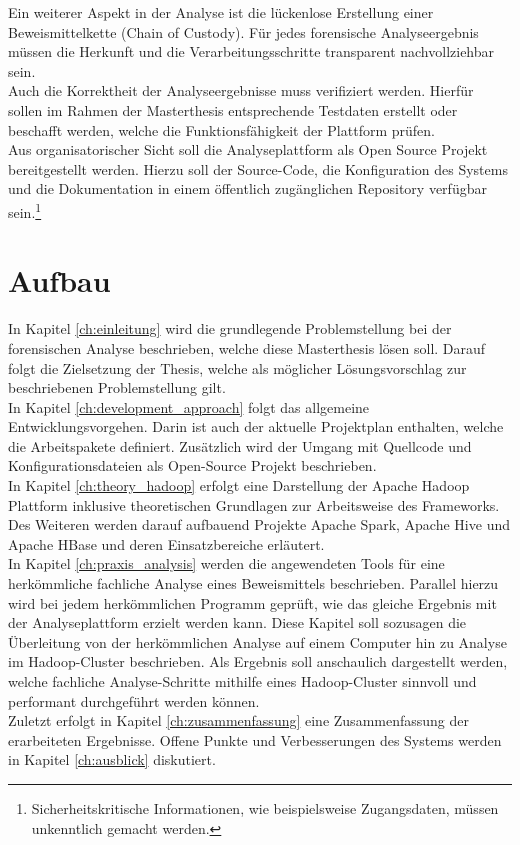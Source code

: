 \noindent
Ein weiterer Aspekt in der Analyse ist die lückenlose Erstellung einer Beweismittelkette (Chain of Custody). Für jedes forensische Analyseergebnis müssen die Herkunft und die Verarbeitungsschritte transparent nachvollziehbar sein. \\

\noindent
Auch die Korrektheit der Analyseergebnisse muss verifiziert werden. Hierfür sollen im Rahmen der Masterthesis entsprechende Testdaten erstellt oder beschafft werden, welche die Funktionsfähigkeit der Plattform prüfen. \\

\noindent
Aus organisatorischer Sicht soll die Analyseplattform als Open Source Projekt bereitgestellt werden. Hierzu soll der Source-Code, die Konfiguration des Systems und die Dokumentation in einem öffentlich zugänglichen Repository verfügbar sein.\footnote{Sicherheitskritische Informationen, wie beispielsweise Zugangsdaten, müssen unkenntlich gemacht werden.}


\section{Aufbau}
In Kapitel \ref{ch:einleitung} wird die grundlegende Problemstellung bei der forensischen Analyse beschrieben, welche diese Masterthesis lösen soll. Darauf folgt die Zielsetzung der Thesis, welche als möglicher Lösungsvorschlag zur beschriebenen Problemstellung gilt.\\
In Kapitel \ref{ch:development_approach} folgt das allgemeine Entwicklungsvorgehen. Darin ist auch der aktuelle Projektplan enthalten, welche die Arbeitspakete definiert.
Zusätzlich wird der Umgang mit Quellcode und Konfigurationsdateien als Open-Source Projekt beschrieben.\\

\noindent
In Kapitel \ref{ch:theory_hadoop} erfolgt eine Darstellung der Apache Hadoop Plattform inklusive theoretischen Grundlagen zur Arbeitsweise des Frameworks. Des Weiteren werden darauf aufbauend Projekte Apache Spark, Apache Hive und Apache HBase und deren Einsatzbereiche erläutert.\\

\noindent
In Kapitel \ref{ch:praxis_analysis} werden die angewendeten Tools für eine herkömmliche fachliche Analyse eines Beweismittels beschrieben. Parallel hierzu wird bei jedem herkömmlichen Programm geprüft, wie das gleiche Ergebnis mit der Analyseplattform erzielt werden kann. Diese Kapitel soll sozusagen die Überleitung von der herkömmlichen Analyse auf einem Computer hin zu Analyse im Hadoop-Cluster beschrieben. Als Ergebnis soll anschaulich dargestellt werden, welche fachliche Analyse-Schritte mithilfe eines Hadoop-Cluster sinnvoll und performant durchgeführt werden können.\\

\noindent
Zuletzt erfolgt in Kapitel \ref{ch:zusammenfassung} eine Zusammenfassung der erarbeiteten Ergebnisse. Offene Punkte und Verbesserungen des Systems werden in Kapitel \ref{ch:ausblick} diskutiert. 
